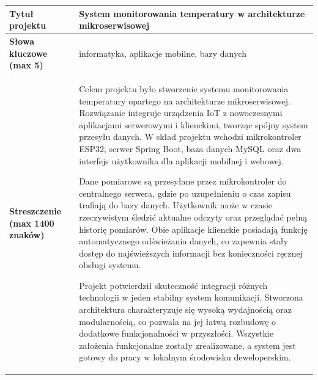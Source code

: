 \noindent
\begin{tabular}{|p{5cm}|p{10cm}|}
\hline
\textbf{Tytuł projektu} & System monitorowania temperatury w architekturze mikroserwisowej\\
\hline
\textbf{Słowa kluczowe (max 5)} & informatyka, aplikacje mobilne, bazy danych\\
\hline
\textbf{Streszczenie (max 1400 znaków)} & Celem projektu było stworzenie systemu monitorowania temperatury opartego na architekturze mikroserwisowej. Rozwiązanie integruje urządzenia IoT z nowoczesnymi aplikacjami serwerowymi i klienckimi, tworząc spójny system przesyłu danych. W skład projektu wchodzi mikrokontroler ESP32, serwer Spring Boot, baza danych MySQL oraz dwa interfejs użytkownika dla aplikacji mobilnej i webowej.

Dane pomiarowe są przesyłane przez mikrokontroler do centralnego serwera, gdzie po uzupełnieniu o czas zapisu trafiają do bazy danych. Użytkownik może w czasie rzeczywistym śledzić aktualne odczyty oraz przeglądać pełną historię pomiarów. Obie aplikacje klienckie posiadają funkcję automatycznego odświeżania danych, co zapewnia stały dostęp do najświeższych informacji bez konieczności ręcznej obsługi systemu.

Projekt potwierdził skuteczność integracji różnych technologii w jeden stabilny system komunikacji. Stworzona architektura charakteryzuje się wysoką wydajnością oraz modularnością, co pozwala na jej łatwą rozbudowę o dodatkowe funkcjonalności w przyszłości. Wszystkie założenia funkcjonalne zostały zrealizowane, a system jest gotowy do pracy w lokalnym środowisku deweloperskim.\\
\hline
\end{tabular}

\vspace{1.5cm}
